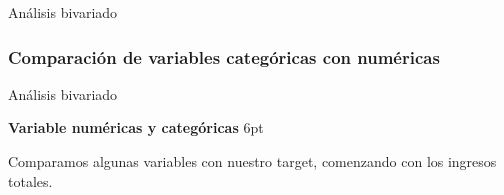\documentclass[pdf]{beamer}
\def\vspace{}%
\begin{document}
{\begin{frame}{Análisis bivariado}
\end{frame}
 
    \subsubsection{Comparación de variables categóricas con numéricas}

\begin{frame}{Análisis bivariado}

    \textbf{Variable numéricas y categóricas}
    \vspace{6pt}

   Comparamos algunas variables con nuestro target, comenzando con los ingresos totales.






 
 
 


\end{frame}}
\end{document}
